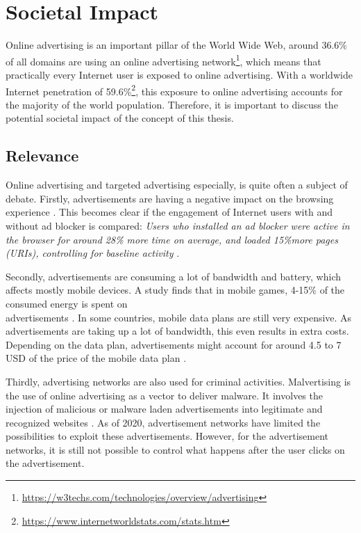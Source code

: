 \chapter{Societal Impact}
\label{cha:societalimpact}

Online advertising is an important pillar of the World Wide Web, around 36.6\% of all domains are using an online advertising network\footnote{\url{https://w3techs.com/technologies/overview/advertising}}, which means that practically every Internet user is exposed to online advertising. With a worldwide Internet penetration of 59.6\%\footnote{\url{https://www.internetworldstats.com/stats.htm}}, this exposure to online advertising accounts for the majority of the world population. Therefore, it is important to discuss the potential societal impact of the concept of this thesis.

\section{Relevance}
Online advertising and targeted advertising especially, is quite often a subject of debate. Firstly, advertisements are having a negative impact on the browsing experience \cite{miroglio2018effect, frik2019impact}. This becomes clear if the engagement of Internet users with and without ad blocker is compared: \textit{Users who installed an ad blocker were active in the browser for around 28\% more time on average, and loaded 15\%more pages (URIs), controlling for baseline activity} \cite{googlefee}.

Secondly, advertisements are consuming a lot of bandwidth and battery, which affects mostly mobile devices. A study finds that in mobile games, 4-15\% of the consumed energy is spent on\\ advertisements \cite{prochkova2012energy}. In some countries, mobile data plans are still very expensive. As advertisements are taking up a lot of bandwidth, this even results in extra costs. Depending on the data plan, advertisements might account for around 4.5 to 7 USD of the price of the mobile data plan \cite{van2012costs}.

Thirdly, advertising networks are also used for criminal activities. Malvertising is the use of online advertising as a vector to deliver malware. It involves the injection of malicious or malware laden advertisements into legitimate and recognized websites \cite{dwyer2016gone}. As of 2020, advertisement networks have limited the possibilities to exploit these advertisements. However, for the advertisement networks, it is still not possible to control what happens after the user clicks on the advertisement.

